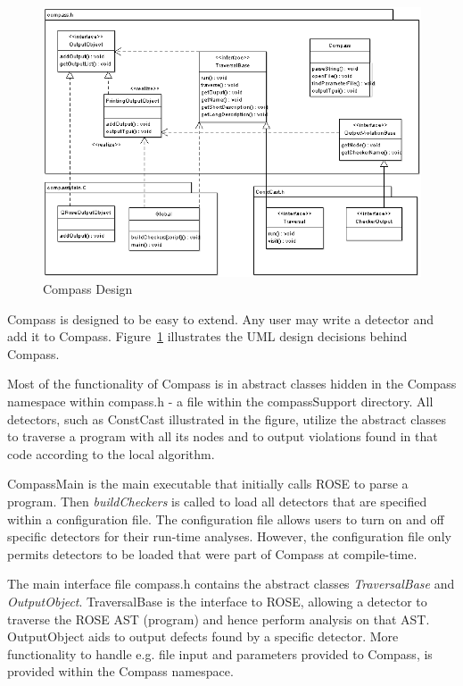 \begin{figure}[thb]
\includegraphics[width=6.0in]{compassdesign.png}
\caption{Compass Design}
\label{CompassDesign}
\end{figure}

Compass is designed to be easy to extend. Any user may write a detector and add it to Compass. Figure~\ref{CompassDesign}
illustrates the UML design decisions behind Compass.


Most of the functionality of Compass is in abstract classes hidden in the Compass namespace within compass.h - a file within
the compassSupport directory. All detectors, such as ConstCast illustrated in the figure, utilize the abstract classes
to traverse a program with all its nodes and to output violations found in that code according to the local algorithm.

CompassMain is the main executable that initially calls ROSE to parse a program. Then \emph{buildCheckers} is called to
load all detectors that are specified within a configuration file. The configuration file allows users to turn on and off
specific detectors for their run-time analyses. However, the configuration file only permits detectors to be loaded that 
were part of Compass at compile-time.

The main interface file compass.h contains the abstract classes \emph{TraversalBase} and 
\emph{OutputObject}. TraversalBase is the interface to ROSE, allowing a detector to traverse the ROSE AST (program) and hence
perform analysis on that AST. OutputObject aids to output defects found by a specific detector. More functionality to handle
e.g. file input and parameters provided to Compass, is provided within the Compass namespace.


